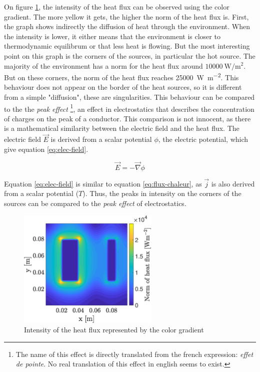 \documentclass[a4paper,12pt,twoside]{article}
\begin{document}
On figure \ref{fig:c-heat-flux}, the intensity of the heat flux can be observed using the color gradient.
The more yellow it gets, the higher the norm of the heat flux is. %
First, the graph shows indirectly the diffusion of heat through the environment.
When the intensity is lower, it either means that the environment is closer to thermodynamic equilibrum or that less heat is flowing. %
But the most interesting point on this graph is the corners of the sources, in particular the hot source.
The majority of the environment has a norm for the heat flux around $\SI{10000}{\watt\per\square\meter}$. But on these corners, the norm of the heat flux reaches \SI{25000}{\watt\per\square\meter}.
This behaviour does not appear on the border of the heat sources, so it is different from a simple "diffusion", these are singularities. %
This behaviour can be compared to the the \textit{peak effect} \footnote{The name of this effect is directly translated from the french expression: \textit{effet de pointe}. No real translation of this effect in english seems to exist.}, an effect in electrostatics that describes the concentration of charges on the peak of a conductor.
This comparison is not innocent, as there is a mathematical similarity between the electric field and the heat flux.
The electric field $\vec{E}$ is derived from a scalar potential $\phi$, the electric potential, which give equation \eqref{eq:elec-field}.

\begin{equation}
  \vec{E} = -\vec{\nabla}\phi
  \label{eq:elec-field}
\end{equation}

Equation \eqref{eq:elec-field} is similar to equation \eqref{eq:flux-chaleur}, as $\vec{j}$ is also derived from a scalar potential ($T$). %
Thus, the peaks in intensity on the corners of the sources can be compared to the \textit{peak effect} of electrostatics.

\begin{figure}[h]
  \centering
  \includegraphics[width=0.6\textwidth]{graphs/c_heat_flux.eps}
  \caption{Intensity of the heat flux represented by the color gradient}
  \label{fig:c-heat-flux}
\end{figure}
\end{document}
